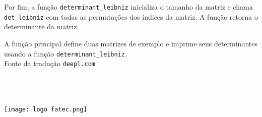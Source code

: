 \documentclass{article}
\begin{document}
Por fim, a função \texttt{determinant\_leibniz} inicializa o tamanho da matriz e chama \texttt{det\_leibniz} com todas as permutações dos índices da matriz. A função retorna o determinante da matriz.

A função principal define duas matrizes de exemplo e imprime seus determinantes usando a função \texttt{determinant\_leibniz}.
\\
Fonte da tradução \texttt{deepl.com}
\\
\\
\\
\\
\begin{picture1}
\label{}
\centering
\texttt{[image: logo fatec.png]}
\\
\end{picture1}
\\
\end{document}
